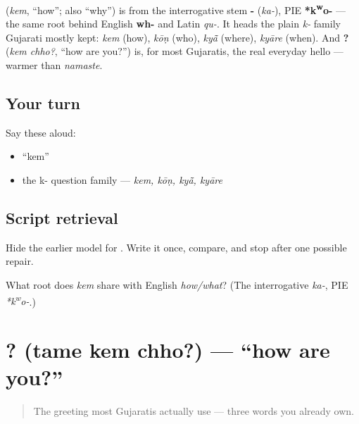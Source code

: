 \begin{cousinweb}
\textbf{} (\emph{kem}, \textquotedblleft{}how\textquotedblright{}; also \textquotedblleft{}why\textquotedblright{}) is from the interrogative stem \textbf{-} (\emph{ka-}), PIE \textbf{*k\textsuperscript{w}o-} — the same root behind English \textbf{wh-} and Latin \emph{qu-}. It heads the plain \emph{k-} family Gujarati mostly kept: \emph{kem} (how), \emph{kōṇ} (who), \emph{kyā̃} (where), \emph{kyāre} (when). And \textbf{ ?} (\emph{kem chho?}, \textquotedblleft{}how are you?\textquotedblright{}) is, for most Gujaratis, the real everyday hello — warmer than \emph{namaste}.
\end{cousinweb}

\subsection*{Your turn}
Say these aloud:

\begin{itemize}
\raggedright
  \item \textquotedblleft{}kem\textquotedblright{}
  \item the k- question family — \emph{kem, kōṇ, kyā̃, kyāre}
\end{itemize}

\subsection*{Script retrieval}
Hide the earlier model for \textbf{}. Write it once, compare, and stop after one possible repair.

\begin{tcolorbox}[breakable,colback=teal!4,colframe=teal!35!black,title={Before you move on}]
What root does \emph{kem} share with English \emph{how/what}? (The interrogative \emph{ka-}, PIE \emph{*k\textsuperscript{w}o-}.)
\end{tcolorbox}
\section[\gu{તમે} \gu{કેમ} \gu{છો}?]{  ? (tame kem chho?) — \textquotedblleft{}how are you?\textquotedblright{}}

\label{lesson:GU-C03-tame-kem-chho}



\begin{quote}
The greeting most Gujaratis actually use — three words you already own.
\end{quote}

